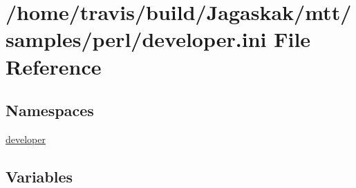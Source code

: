 \hypertarget{developer_8ini}{\section{/home/travis/build/\-Jagaskak/mtt/samples/perl/developer.ini File Reference}
\label{developer_8ini}
}
\subsection*{Namespaces}
\begin{DoxyCompactItemize}
\item 
\hyperlink{namespacedeveloper}{developer}
\end{DoxyCompactItemize}
\subsection*{Variables}
